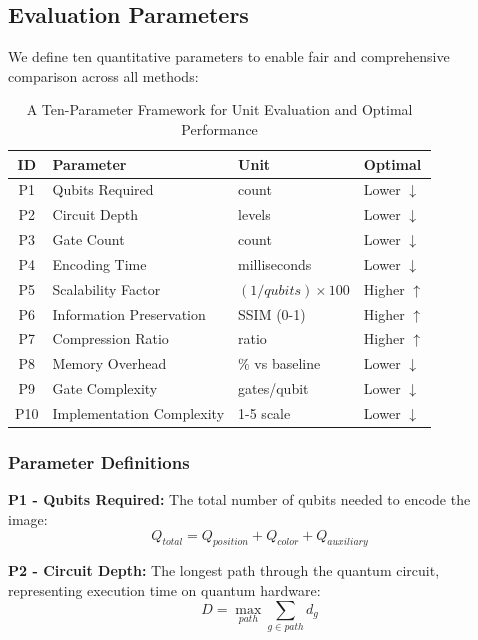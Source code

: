\documentclass[11pt,a4paper]{article}
\begin{document}
\subsection{Evaluation Parameters}
\label{subsec:evaluation_params}

We define ten quantitative parameters to enable fair and comprehensive comparison across all methods:

\begin{table}[H]
\centering
\caption{A Ten-Parameter Framework for Unit Evaluation and Optimal Performance}
\label{tab:ten_parameters}
\begin{tabular}{@{}clll@{}}
\toprule
\textbf{ID} & \textbf{Parameter} & \textbf{Unit} & \textbf{Optimal} \\
\midrule
P1 & Qubits Required & count & Lower $\downarrow$ \\
P2 & Circuit Depth & levels & Lower $\downarrow$ \\
P3 & Gate Count & count & Lower $\downarrow$ \\
P4 & Encoding Time & milliseconds & Lower $\downarrow$ \\
P5 & Scalability Factor & $(1/qubits) \times 100$ & Higher $\uparrow$ \\
P6 & Information Preservation & SSIM (0-1) & Higher $\uparrow$ \\
P7 & Compression Ratio & ratio & Higher $\uparrow$ \\
P8 & Memory Overhead & \% vs baseline & Lower $\downarrow$ \\
P9 & Gate Complexity & gates/qubit & Lower $\downarrow$ \\
P10 & Implementation Complexity & 1-5 scale & Lower $\downarrow$ \\
\bottomrule
\end{tabular}
\end{table}

\subsubsection{Parameter Definitions}

\textbf{P1 - Qubits Required:}
The total number of qubits needed to encode the image:
\begin{equation}
Q_{total} = Q_{position} + Q_{color} + Q_{auxiliary}
\label{eq:p1}
\end{equation}

\textbf{P2 - Circuit Depth:}
The longest path through the quantum circuit, representing execution time on quantum hardware:
\begin{equation}
D = \max_{path} \sum_{g \in path} d_g
\label{eq:p2}
\end{equation}
\end{document}
